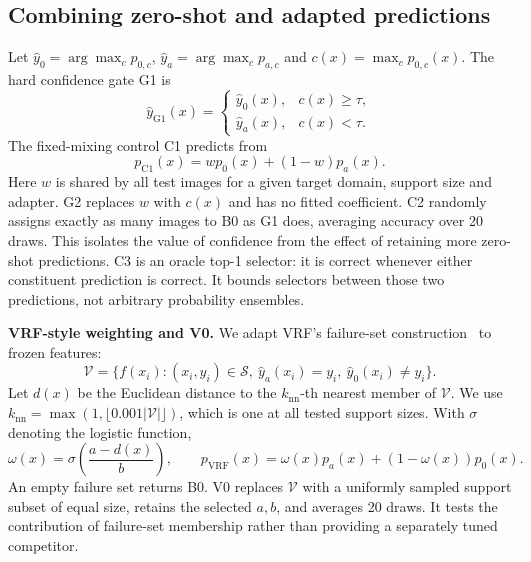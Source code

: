 \subsection{Combining zero-shot and adapted predictions}
Let $\hat y_0=\arg\max_c p_{0,c}$, $\hat y_a=\arg\max_c p_{a,c}$ and $c(x)=\max_c p_{0,c}(x)$. The hard confidence gate G1 is
\begin{equation}
 \hat y_{\mathrm{G1}}(x)=
 \begin{cases}
  \hat y_0(x), & c(x)\geq\tau,\\
  \hat y_a(x), & c(x)<\tau .
 \end{cases}
\end{equation}
The fixed-mixing control C1 predicts from
\begin{equation}
 p_{\mathrm{C1}}(x)=w p_0(x)+(1-w)p_a(x).
 \label{eq:mix}
\end{equation}
Here $w$ is shared by all test images for a given target domain, support size and adapter. G2 replaces $w$ with $c(x)$ and has no fitted coefficient. C2 randomly assigns exactly as many images to B0 as G1 does, averaging accuracy over 20 draws. This isolates the value of confidence from the effect of retaining more zero-shot predictions. C3 is an oracle top-1 selector: it is correct whenever either constituent prediction is correct. It bounds selectors between those two predictions, not arbitrary probability ensembles.

\textbf{VRF-style weighting and V0.}
We adapt VRF's failure-set construction~\citep{zhu2024vrf} to frozen features:
\begin{equation}
 \mathcal{V}=\{f(x_i):(x_i,y_i)\in\mathcal{S},\
             \hat y_a(x_i)=y_i,\ \hat y_0(x_i)\ne y_i\}.
\end{equation}
Let $d(x)$ be the Euclidean distance to the $k_{\mathrm{nn}}$-th nearest member of $\mathcal{V}$. We use $k_{\mathrm{nn}}=\max(1,\lfloor0.001|\mathcal{V}|\rfloor)$, which is one at all tested support sizes. With $\sigma$ denoting the logistic function,
\begin{equation}
 \omega(x)=\sigma\!\left(\frac{a-d(x)}{b}\right),\qquad
 p_{\mathrm{VRF}}(x)=\omega(x)p_a(x)+(1-\omega(x))p_0(x).
\end{equation}
An empty failure set returns B0. V0 replaces $\mathcal{V}$ with a uniformly sampled support subset of equal size, retains the selected $a,b$, and averages 20 draws. It tests the contribution of failure-set membership rather than providing a separately tuned competitor.

